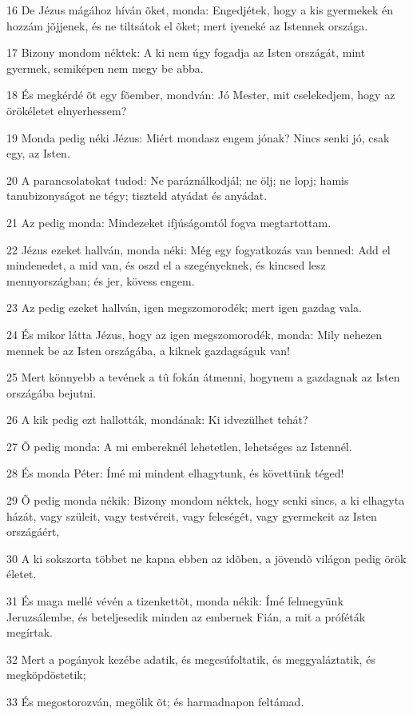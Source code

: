 \par 16 De Jézus mágához híván õket, monda: Engedjétek, hogy a kis gyermekek én hozzám jõjjenek, és ne tiltsátok el õket; mert iyeneké az Istennek országa.
\par 17 Bizony mondom néktek: A ki nem úgy fogadja az Isten országát, mint gyermek, semiképen nem megy be abba.
\par 18 És megkérdé õt egy fõember, mondván: Jó Mester, mit cselekedjem, hogy az örökéletet elnyerhessem?
\par 19 Monda pedig néki Jézus: Miért mondasz engem jónak? Nincs senki jó, csak egy, az Isten.
\par 20 A parancsolatokat tudod: Ne paráználkodjál; ne ölj; ne lopj; hamis tanubizonyságot ne tégy; tiszteld atyádat és anyádat.
\par 21 Az pedig monda: Mindezeket ifjúságomtól fogva megtartottam.
\par 22 Jézus ezeket hallván, monda néki: Még egy fogyatkozás van benned: Add el mindenedet, a mid van, és oszd el a szegényeknek, és kincsed lesz mennyországban; és jer, kövess engem.
\par 23 Az pedig ezeket hallván, igen megszomorodék; mert igen gazdag vala.
\par 24 És mikor látta Jézus, hogy az igen megszomorodék, monda: Mily nehezen mennek be az Isten országába, a kiknek gazdagságuk van!
\par 25 Mert könnyebb a tevének a tû fokán átmenni, hogynem a gazdagnak az Isten országába bejutni.
\par 26 A kik pedig ezt hallották, mondának: Ki idvezülhet tehát?
\par 27 Õ pedig monda: A mi embereknél lehetetlen, lehetséges az Istennél.
\par 28 És monda Péter: Ímé mi mindent elhagytunk, és követtünk téged!
\par 29 Õ pedig monda nékik: Bizony mondom néktek, hogy senki sincs, a ki elhagyta házát, vagy szüleit, vagy testvéreit, vagy feleségét, vagy gyermekeit az Isten országáért,
\par 30 A ki sokszorta többet ne kapna ebben az idõben, a jövendõ világon pedig örök életet.
\par 31 És maga mellé vévén a tizenkettõt, monda nékik: Ímé felmegyünk Jeruzsálembe, és beteljesedik minden az embernek Fián, a mit a próféták megírtak.
\par 32 Mert a pogányok kezébe adatik, és megcsúfoltatik, és meggyaláztatik, és megköpdöstetik;
\par 33 És megostorozván, megölik õt; és harmadnapon feltámad.
